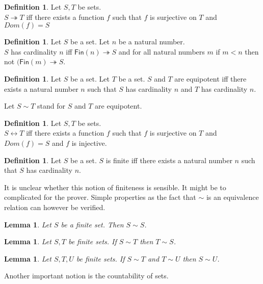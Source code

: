 \documentclass[10pt]{article}
\newenvironment{forthel}{\begin{leftbar}}{\end{leftbar}}
\newcommand{\Fin}{\mathsf{Fin}}
\theoremstyle{definition}
\newtheorem{definition}[theorem]{Definition}
\theoremstyle{plain}
\newtheorem{lemma}[theorem]{Lemma}
\theoremstyle{remark}
\begin{document}
\begin{forthel}
\begin{definition}
		Let $S,T$ be sets. \\
		$S \twoheadrightarrow T$ iff there exists a function $f$ such that $f$ is surjective on $T$ and $Dom(f)=S$
	\end{definition}
	\begin{definition}
		Let $S$ be a set. Let $n$ be a natural number. \\
		$S$ has cardinality $n$ iff $\Fin(n) \twoheadrightarrow S$ and for all natural numbers $m$ if $m<n$ then not $(\Fin(m) \twoheadrightarrow S$.
	\end{definition}
	\begin{definition}
		Let $S$ be a set. Let $T$ be a set. $S$ and $T$ are equipotent iff there exists a natural number $n$ such that $S$ has cardinality $n$ and $T$ has cardinality $n$.
	\end{definition}
	Let $S\sim T$ stand for $S$ and $T$ are equipotent.
	\begin{definition}
		Let $S,T$ be sets. \\
		$S \leftrightarrow T$ iff there exists a function $f$ such that $f$ is surjective on $T$ and $Dom(f) = S$ and $f$ is injective.
	\end{definition}
	\begin{definition}
		Let $S$ be a set. $S$ is finite iff there exists a natural number $n$ such that $S$ has cardinality $n$.
	\end{definition}
\end{forthel}
It is unclear whether this notion of finiteness is sensible. It might be to complicated for the prover. Simple properties as the fact that $\sim$ is an equivalence relation can however be verified.
\begin{forthel}
	\begin{lemma}
		Let $S$ be a finite set. Then $S \sim S$.
	\end{lemma}
	\begin{lemma}
		Let $S,T$ be finite sets. If $S\sim T$ then $T\sim S$.
	\end{lemma}
	\begin{lemma}
		Let $S,T,U$ be finite sets. If $S \sim T$ and $T \sim U$ then $S \sim U$.
	\end{lemma}
\end{forthel}
Another important notion is the countability of sets.
\end{document}
